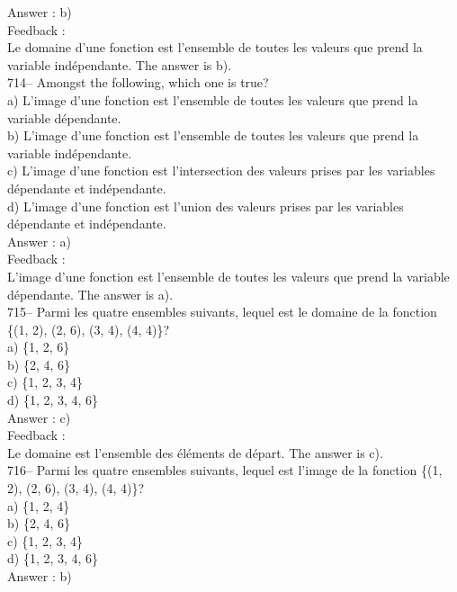\documentclass[letterpaper, 12pt]{article}
\begin{document}
Answer : b)\\

Feedback : \\
Le domaine d'une fonction est l'ensemble de toutes les valeurs que prend la
variable ind\'ependante.  The answer is b).\\

714--  Amongst the following, which one is true?\\
a) L'image d'une fonction est l'ensemble de toutes les valeurs que prend la
variable d\'ependante.\\
b) L'image d'une fonction est l'ensemble de toutes les valeurs que prend la
variable ind\'ependante.\\
c) L'image d'une fonction est l'intersection des valeurs prises par les
variables d\'ependante et ind\'ependante.\\
d) L'image d'une fonction est l'union des valeurs prises par les variables
d\'ependante et ind\'ependante.\\

Answer : a)\\

Feedback : \\
L'image d'une fonction est l'ensemble de toutes les valeurs que prend la
variable d\'ependante.  The answer is a).\\

715--  Parmi les quatre ensembles suivants, lequel est le domaine de la
fonction \{(1, 2), (2, 6), (3, 4), (4, 4)\}?\\
a) \{1, 2, 6\}\\
b) \{2, 4, 6\}\\
c) \{1, 2, 3, 4\}\\
d) \{1, 2, 3, 4, 6\}\\

Answer : c)\\

Feedback : \\
Le domaine est l'ensemble des \'el\'ements de d\'epart.  The answer is
c).\\

716--  Parmi les quatre ensembles suivants, lequel est l'image de la
fonction \{(1, 2), (2, 6), (3, 4), (4, 4)\}?\\
a) \{1, 2, 4\}\\
b) \{2, 4, 6\}\\
c) \{1, 2, 3, 4\}\\
d) \{1, 2, 3, 4, 6\}\\

Answer : b)\\
\end{document}
